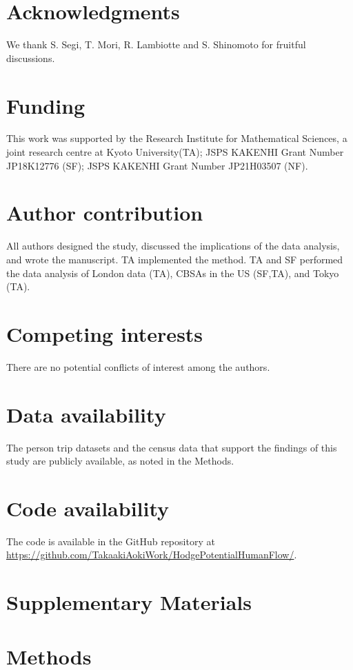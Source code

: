 \documentclass[]{article}
\begin{document}



\section*{Acknowledgments}
We thank S. Segi,  T. Mori, R. Lambiotte and S. Shinomoto for fruitful discussions.

\section*{Funding}
This work was supported by the Research Institute for Mathematical Sciences, a joint research centre at Kyoto University(TA);
JSPS KAKENHI Grant Number JP18K12776 (SF);
JSPS KAKENHI Grant Number JP21H03507 (NF).

\section*{Author contribution}
All authors designed the study, discussed the implications of the data analysis, and wrote the manuscript.
TA implemented the method. 
TA and SF performed the data analysis of London data (TA), CBSAs in the US (SF,TA), and Tokyo (TA).

\section*{Competing interests}
There are no potential conflicts of interest among the authors.

\section*{Data availability}
The person trip datasets and the census data that support the findings of this study are publicly available, as noted in the Methods.

\section*{Code availability}
The code is available in the GitHub repository at \url{https://github.com/TakaakiAokiWork/HodgePotentialHumanFlow/}.

\section*{Supplementary Materials}
\section*{Methods}
\end{document}
